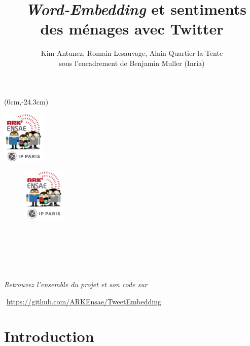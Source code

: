 \documentclass[11pt,french,french]{article}
\title{~\emph{Word-Embedding} et sentiments des ménages avec Twitter}
\author{Kim Antunez, Romain Lesauvage, Alain Quartier-la-Tente\\
sous l'encadrement de Benjamin Muller (Inria)}
\date{}
\begin{document}
\maketitle


{
\hypersetup{linkcolor=black}
\setcounter{tocdepth}{2}
\tableofcontents
}
\begin{textblock*}{\textwidth}(0cm,-24.3cm)
\begin{center}
\includegraphics[height=2.5cm]{img/LOGO-ENSAE.png}
\end{center}
\end{textblock*}

\newpage 

\begin{center}
\begin{minipage}{0.7\textwidth}

\begin{figure}
\includegraphics[height=2.5cm]{img/LOGO-ENSAE.png}
\end{figure}

$\phantom{saut}$

$\phantom{saut}$

$\phantom{saut}$


\emph{Retrouvez l'ensemble du projet et son code sur}

$\phantom{}$%
\url{https://github.com/ARKEnsae/TweetEmbedding}

\end{minipage}
\end{center}

\vspace{0.5cm}

\section*{Introduction}\label{introduction}
\end{document}
